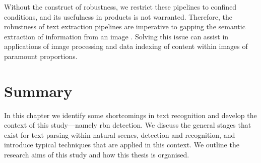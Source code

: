 Without the construct of robustness, we restrict these pipelines to confined conditions, and its usefulness in products is not warranted. Therefore, the robustness of text extraction pipelines are imperative to gapping the semantic extraction of information from an image \citep{Smeulders:2000tx}. Solving this issue can assist in applications of image processing and data indexing of content within images \citep{Faloutsos:1994gr} of paramount proportions.






\section{Summary}

In this chapter we identify some shortcomings in text recognition and develop the context of this study---namely \gls{rbn} detection. We discuss the general stages that exist for text parsing within natural scenes, detection and recognition, and introduce typical techniques that are applied in this context. We outline the research aims of this study and how this thesis is organised.